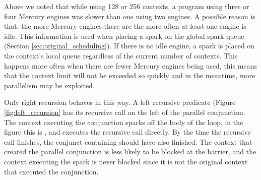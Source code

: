 Above we noted that while using 128 or 256 contexts,
a program using three or four Mercury engines was slower than one using
two engines.
A possible reason is that:
the more Mercury engines there are the more often at least one engine is
idle.
This information is used when placing a spark on the global spark
queue (Section \ref{sec:original_scheduling}).
If there is no idle engine,
a spark is placed on the context's local queue regardless of the current
number of contexts.
This happens more often when there are fewer Mercury engines being used,
this means that the context limit will not be exceeded so quickly
and in the meantime,
more parallelism may be exploited.

Only right recursion behaves in this way.
A left recursive predicate (Figure \ref{fig:left_recursion} has its
recursive call on the left of the parallel conjunction.
The context executing the conjunction sparks off the body of the loop,
in the figure this is ,
and executes the recursive call directly.
By the time the recursive call finishes,
the conjunct containing  should have also finished.
The context that created the parallel conjunction is less likely to be
blocked at the barrier,
and the context executing the spark is never blocked since it is not the
original context that executed the conjunction.

